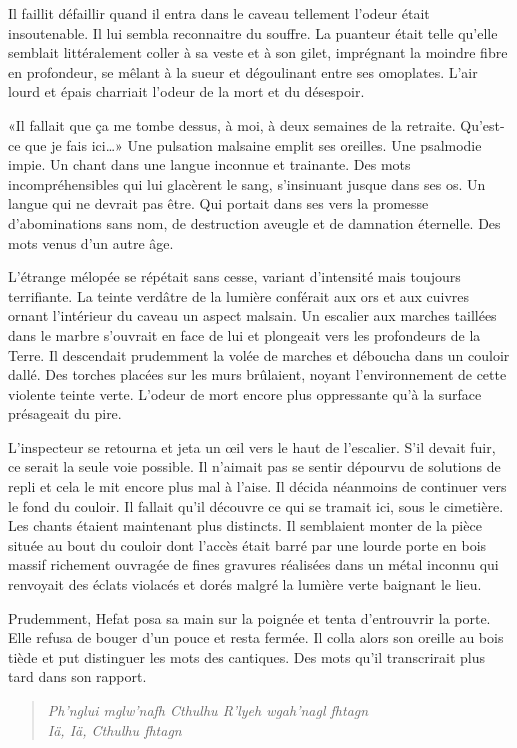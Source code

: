 \documentclass[12pt,a4paper,oneside]{memoir}
\begin{document}
Il faillit défaillir quand il entra dans le caveau tellement l'odeur était insoutenable. Il lui sembla reconnaitre du 
souffre. La puanteur était telle qu'elle semblait littéralement coller à sa veste et à son gilet, imprégnant la 
moindre fibre en profondeur, se mêlant à la sueur et dégoulinant entre ses omoplates. L'air lourd et épais charriait 
l'odeur de la mort et du désespoir.

«Il fallait que ça me tombe dessus, à moi, à deux semaines de la retraite. Qu'est-ce que je fais ici…» Une pulsation 
malsaine emplit ses oreilles. Une psalmodie impie. Un chant dans une langue inconnue et trainante. Des mots 
incompréhensibles qui lui glacèrent le sang, s'insinuant jusque dans ses os. Un langue qui ne devrait pas être. Qui 
portait dans ses vers la promesse d'abominations sans nom, de destruction aveugle et de damnation éternelle. Des mots 
venus d'un autre âge.

L'étrange mélopée se répétait sans cesse, variant d'intensité mais toujours terrifiante. La teinte verdâtre de la 
lumière conférait aux ors et aux cuivres ornant l'intérieur du caveau un aspect malsain. Un escalier aux marches 
taillées dans le marbre s'ouvrait en face de lui et plongeait vers les profondeurs de la Terre. Il descendait 
prudemment 
la volée de marches et déboucha dans un couloir dallé. Des torches placées sur les murs brûlaient, noyant 
l'environnement de cette violente teinte verte. L'odeur de mort encore plus oppressante qu'à la surface présageait du 
pire.

L'inspecteur se retourna et jeta un œil vers le haut de l'escalier. S'il devait fuir, ce serait la seule voie possible. 
Il n'aimait pas se sentir dépourvu de solutions de repli et cela le mit encore plus mal à l'aise. Il décida 
néanmoins de continuer vers le fond du couloir. Il fallait qu'il découvre ce qui se tramait ici, sous le cimetière. Les 
chants étaient maintenant plus distincts. Il semblaient monter de la pièce située au bout du couloir dont l'accès était 
barré par une lourde porte en bois massif richement ouvragée de fines gravures réalisées dans un métal inconnu qui 
renvoyait des éclats violacés et dorés malgré la lumière verte baignant le lieu.

Prudemment, Hefat posa sa main sur la poignée et tenta d'entrouvrir la porte. Elle refusa de bouger d'un pouce et resta 
fermée. Il colla alors son oreille au bois tiède et put distinguer les mots des cantiques. Des mots qu'il transcrirait 
plus tard dans son rapport.

\begin{verse}
\emph{Ph’nglui mglw’nafh Cthulhu R’lyeh wgah’nagl fhtagn \\
Iä, Iä, Cthulhu fhtagn}
\end{verse}
\end{document}
